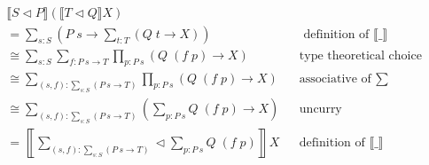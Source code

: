 {\begin{code}%
\>[0]\AgdaSpace{}%
\AgdaSymbol{:}\AgdaSpace{}%
\AgdaSpace{}%
\AgdaSpace{}%
\AgdaSpace{}%
\AgdaSpace{}%
\<%
\\
\>[0]\AgdaSymbol{(}\AgdaSpace{}%
\AgdaSpace{}%
\AgdaSymbol{)}\AgdaSpace{}%
\AgdaSpace{}%
\AgdaSymbol{(}\AgdaSpace{}%
\AgdaSpace{}%
\AgdaSymbol{)}\AgdaSpace{}%
\AgdaSymbol{=}\AgdaSpace{}%
\AgdaSymbol{(}\AgdaFunction{Σ[}\AgdaSpace{}%
\AgdaSpace{}%
\AgdaSpace{}%
\AgdaSpace{}%
\AgdaFunction{]}\AgdaSpace{}%
\AgdaSymbol{(}\AgdaSpace{}%
\AgdaSpace{}%
\AgdaSpace{}%
\AgdaSymbol{))}\AgdaSpace{}%
\AgdaSpace{}%
\AgdaSpace{}%
\AgdaSymbol{(}\AgdaSpace{}%
\AgdaOperator{\AgdaInductiveConstructor{,}}\AgdaSpace{}%
\AgdaSymbol{)}\AgdaSpace{}%
\AgdaSpace{}%
\AgdaFunction{Σ[}\AgdaSpace{}%
\AgdaSpace{}%
\AgdaSpace{}%
\AgdaSpace{}%
\AgdaSpace{}%
\AgdaFunction{]}\AgdaSpace{}%
\AgdaSpace{}%
\AgdaSymbol{(}\AgdaSpace{}%
\AgdaSymbol{)}\<%
\end{code}

\begin{align*}
& \llbracket S \triangleleft P \rrbracket (\llbracket T \triangleleft Q \rrbracket X) \\
&= \sum_{s : S} \left( P \; s \to \sum_{t : T} (Q \; t \to X) \right) && \text{ definition of $\llbracket \_ \rrbracket$} \\
&\cong \sum_{s : S} \sum_{f : P \: s \to T} \prod_{p : P \: s} (Q \; (f \; p) \to X) && \text{type theoretical choice} \\
&\cong \sum_{(s , f) : \sum_{s : S} ( P \: s \to T )} \prod_{p : P \: s} (Q \; (f \; p) \to X) && \text{associative of $\sum$} \\
&\cong \sum_{(s , f) : \sum_{s : S} ( P \: s \to T )} \left( \sum_{p : P \: s} Q \; (f \; p) \to X \right) && \text{uncurry} \\
&= \left\llbracket \sum_{(s , f) : \sum_{s : S} ( P \: s \to T )} \triangleleft \sum_{p : P \: s} Q \; (f \; p) \right\rrbracket X && \text{definition of $\llbracket \_ \rrbracket$} \\
\end{align*}

}
